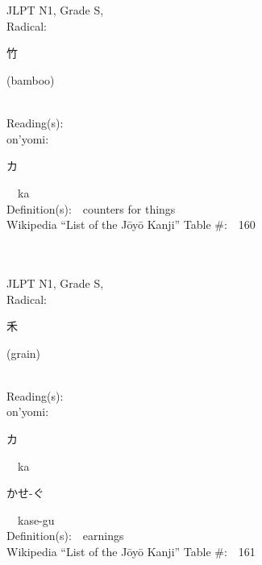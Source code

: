 \begin{multicols}{2}
\ \ \\
{\fontsize{34pt}{40pt}  }\ \ \\
{JLPT N1, Grade S, \\Radical:\ \ {\begin{CJK}{UTF8}{min} 竹 \end{CJK}} (bamboo) } \\
Reading(s):\ \ \\
{\hspace*{1em}}on'yomi:\ \ \\
{\hspace*{2em}}{\begin{CJK}{UTF8}{min} カ \end{CJK}}\ \ ka\ \ \\
Definition(s):\ \ counters for things \\
Wikipedia ``List of the J\=oy\=o Kanji'' Table \#:\ \ 160 \\
\ \ \\
{\fontsize{34pt}{40pt}  }\ \ \\
{JLPT N1, Grade S, \\Radical:\ \ {\begin{CJK}{UTF8}{min} 禾 \end{CJK}} (grain) } \\
Reading(s):\ \ \\
{\hspace*{1em}}on'yomi:\ \ \\
{\hspace*{2em}}{\begin{CJK}{UTF8}{min} カ \end{CJK}}\ \ ka\ \ \\
{\hspace*{2em}}{\begin{CJK}{UTF8}{min} かせ-ぐ \end{CJK}}\ \ kase-gu\ \ \\
Definition(s):\ \ earnings \\
Wikipedia ``List of the J\=oy\=o Kanji'' Table \#:\ \ 161 \\
\ \ \\
{\fontsize{34pt}{40pt}  }\ \ \\

\end{multicols}
